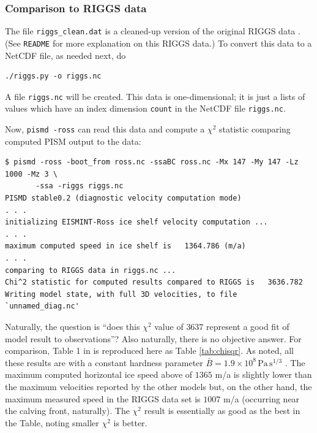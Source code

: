 \documentclass[11pt,final]{amsart}
\begin{document}
\subsubsection*{Comparison to RIGGS data}  The file \verb|riggs_clean.dat| is a cleaned-up version of the original RIGGS data \cite{RIGGS1, RIGGS2}.  (See \texttt{README} for more explanation on this RIGGS data.)  To convert this data to a NetCDF file, as needed next, do

\begin{verbatim}
./riggs.py -o riggs.nc
\end{verbatim}
A file \verb|riggs.nc| will be created.  This data is one-dimensional; it is just a lists of values which have an index dimension \verb|count| in the NetCDF file \verb|riggs.nc|.

Now, \verb|pismd -ross| can read this data and compute a $\chi^2$ statistic comparing computed PISM output to the data:

\small
\begin{verbatim}
$ pismd -ross -boot_from ross.nc -ssaBC ross.nc -Mx 147 -My 147 -Lz 1000 -Mz 3 \
       -ssa -riggs riggs.nc
PISMD stable0.2 (diagnostic velocity computation mode)
. . .
initializing EISMINT-Ross ice shelf velocity computation ...
. . . 
maximum computed speed in ice shelf is   1364.786 (m/a)
. . .
comparing to RIGGS data in riggs.nc ...
Chi^2 statistic for computed results compared to RIGGS is   3636.782
Writing model state, with full 3D velocities, to file `unnamed_diag.nc'
\end{verbatim}
\normalsize

Naturally, the question is ``does this $\chi^2$ value of $3637$ represent a good fit of model result to observations''?  Also naturally, there is no objective answer.  For comparison, Table 1 in \cite{MacAyealetal} is reproduced here as Table \ref{tab:chisqr}.  As noted, all these results are with a constant hardness parameter $\bar B = 1.9 \times 10^8 \, \text{Pa}\, \text{s}^{1/3}$ \cite{MacAyealetal}. The maximum computed horizontal ice speed above of $1365$ m/a is slightly lower than the maximum velocities reported by the other models but, on the other hand, the maximum measured speed in the RIGGS data set is $1007$ m/a (occurring near the calving front, naturally).  The $\chi^2$ result is essentially as good as the best in the Table, noting smaller $\chi^2$ is better.
\end{document}
